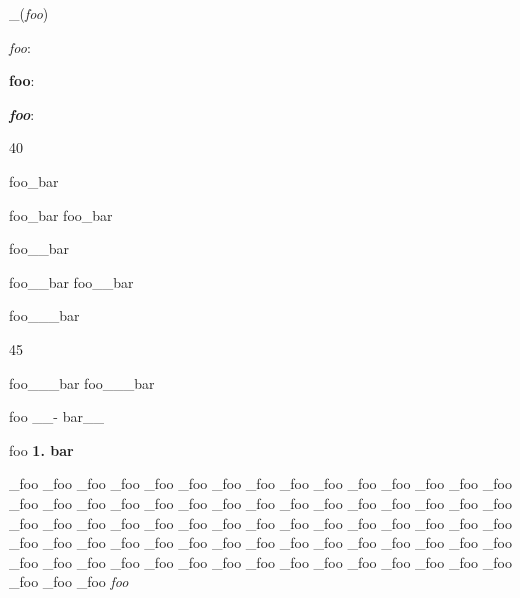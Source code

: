 \_(\emph{foo})

\emph{foo}:

\textbf{foo}:

\textbf{\emph{foo}}:

40

foo\_bar

foo\_bar foo\_bar

foo\_\_bar

foo\_\_bar foo\_\_bar

foo\_\_\_bar

45

foo\_\_\_bar foo\_\_\_bar

foo \_\_- bar\_\_

foo \textbf{1. bar}

\_foo
\_foo
\_foo
\_foo
\_foo
\_foo
\_foo
\_foo
\_foo
\_foo
\_foo
\_foo
\_foo
\_foo
\_foo
\_foo
\_foo
\_foo
\_foo
\_foo
\_foo
\_foo
\_foo
\_foo
\_foo
\_foo
\_foo
\_foo
\_foo
\_foo
\_foo
\_foo
\_foo
\_foo
\_foo
\_foo
\_foo
\_foo
\_foo
\_foo
\_foo
\_foo
\_foo
\_foo
\_foo
\_foo
\_foo
\_foo
\_foo
\_foo
\_foo
\_foo
\_foo
\_foo
\_foo
\_foo
\_foo
\_foo
\_foo
\_foo
\_foo
\_foo
\_foo
\_foo
\_foo
\_foo
\_foo
\_foo
\_foo
\_foo
\_foo
\_foo
\_foo
\_foo
\_foo
\_foo
\_foo
\_foo
\emph{foo}
